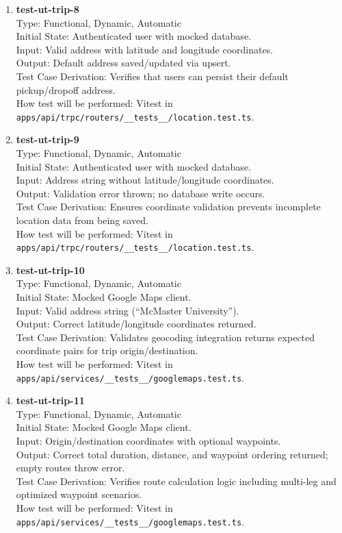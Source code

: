 \documentclass[12pt, titlepage]{article}
\begin{document}
\begin{enumerate}
\item \textbf{test-ut-trip-8}\\
Type: Functional, Dynamic, Automatic\\
Initial State: Authenticated user with mocked database.\\
Input: Valid address with latitude and longitude coordinates.\\
Output: Default address saved/updated via upsert.\\
Test Case Derivation: Verifies that users can persist their default pickup/dropoff address.\\
How test will be performed: Vitest in \texttt{apps/api/trpc/routers/\_\_tests\_\_/location.test.ts}.\\

\item \textbf{test-ut-trip-9}\\
Type: Functional, Dynamic, Automatic\\
Initial State: Authenticated user with mocked database.\\
Input: Address string without latitude/longitude coordinates.\\
Output: Validation error thrown; no database write occurs.\\
Test Case Derivation: Ensures coordinate validation prevents incomplete location data from being saved.\\
How test will be performed: Vitest in \texttt{apps/api/trpc/routers/\_\_tests\_\_/location.test.ts}.\\

\item \textbf{test-ut-trip-10}\\
Type: Functional, Dynamic, Automatic\\
Initial State: Mocked Google Maps client.\\
Input: Valid address string (``McMaster University'').\\
Output: Correct latitude/longitude coordinates returned.\\
Test Case Derivation: Validates geocoding integration returns expected coordinate pairs for trip origin/destination.\\
How test will be performed: Vitest in \texttt{apps/api/services/\_\_tests\_\_/googlemaps.test.ts}.\\

\item \textbf{test-ut-trip-11}\\
Type: Functional, Dynamic, Automatic\\
Initial State: Mocked Google Maps client.\\
Input: Origin/destination coordinates with optional waypoints.\\
Output: Correct total duration, distance, and waypoint ordering returned; empty routes throw error.\\
Test Case Derivation: Verifies route calculation logic including multi-leg and optimized waypoint scenarios.\\
How test will be performed: Vitest in \texttt{apps/api/services/\_\_tests\_\_/googlemaps.test.ts}.\\


\end{enumerate}
\end{document}
